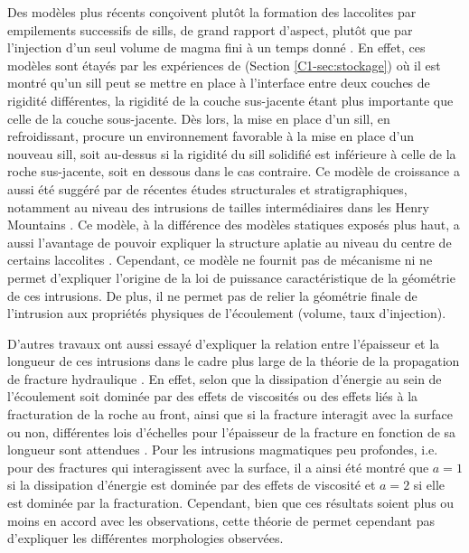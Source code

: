 Des modèles plus récents conçoivent plutôt la formation des laccolites
par empilements successifs de sills, de grand rapport d'aspect, plutôt
que par l'injection d'un seul volume de magma fini à un temps donné
\citep{Menand:2011ki}. En effet, ces modèles sont étayés par les
expériences de \citet{Kavanagh:2006ig} (Section \ref{C1-sec:stockage})
où il est montré qu'un sill peut se mettre en place à l'interface
entre deux couches de rigidité différentes, la rigidité de la couche
sus-jacente étant plus importante que celle de la couche
sous-jacente. Dès lors, la mise en place d'un sill, en refroidissant,
procure un environnement favorable à la mise en place d'un nouveau
sill, soit au-dessus si la rigidité du sill solidifié est inférieure à
celle de la roche sus-jacente, soit en dessous dans le cas
contraire. Ce modèle de croissance a aussi été suggéré par de récentes
études structurales et stratigraphiques, notamment au niveau des
intrusions de tailles intermédiaires dans les Henry Mountains
\citep{Horsman:2005ct,Morgan:2008hj,Horsman:2009gea,Menand:2011ki}. Ce
modèle, à la différence des modèles statiques exposés plus haut, a
aussi l'avantage de pouvoir expliquer la structure aplatie au niveau
du centre de certains laccolites \citep{Morgan:2008hj}. Cependant, ce
modèle ne fournit pas de mécanisme ni ne permet d'expliquer l'origine
de la loi de puissance caractéristique de la géométrie de ces
intrusions. De plus, il ne permet pas de relier la géométrie finale de
l'intrusion aux propriétés physiques de l'écoulement (volume, taux
d'injection).

D'autres travaux ont aussi essayé d'expliquer la relation entre
l'épaisseur et la longueur de ces intrusions dans le cadre plus large
de la théorie de la propagation de fracture hydraulique
\citep{Bunger:2008cl,Cruden:tg}. En effet, selon que la dissipation
d'énergie au sein de l'écoulement soit dominée par des effets de
viscosités ou des effets liés à la fracturation de la roche au front,
ainsi que si la fracture interagit avec la surface ou non, différentes
lois d'échelles pour l'épaisseur de la fracture en fonction de sa
longueur sont attendues \citep{Savitski:2002gy,Bunger:2005em}. Pour
les intrusions magmatiques peu profondes, i.e. pour des fractures qui
interagissent avec la surface, il a ainsi été montré que $a=1$ si la
dissipation d'énergie est dominée par des effets de viscosité et $a=2$
si elle est dominée par la fracturation. Cependant, bien que ces
résultats soient plus ou moins en accord avec les observations, cette
théorie de permet cependant pas d'expliquer les différentes
morphologies observées.

